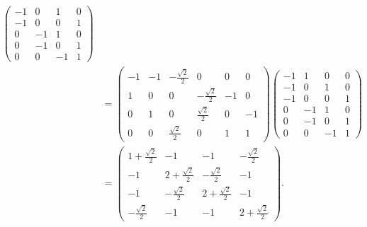 \begin{loesung}
\begin{teilaufgaben}
\begin{align*}
\begin{pmatrix}
  -1&  0&  1&  0\\
  -1&  0&  0&  1\\
   0& -1&  1&  0\\
   0& -1&  0&  1\\
   0&  0& -1&  1
\end{pmatrix}
\\
&=
\begin{pmatrix}
-1&-1&-\frac{\sqrt{2}}2&                0& 0& 0\\
 1& 0&                0&-\frac{\sqrt{2}}2&-1& 0\\
 0& 1&                0& \frac{\sqrt{2}}2& 0&-1\\
 0& 0& \frac{\sqrt{2}}2&                0& 1& 1
\end{pmatrix}
\begin{pmatrix}
  -1&  1&  0&  0\\
  -1&  0&  1&  0\\
  -1&  0&  0&  1\\
   0& -1&  1&  0\\
   0& -1&  0&  1\\
   0&  0& -1&  1
\end{pmatrix}
\\
&=
\begin{pmatrix}
 1+\frac{\sqrt{2}}2&                -1&                -1& -\frac{\sqrt{2}}2\\
-1                 &2+\frac{\sqrt{2}}2& -\frac{\sqrt{2}}2&                -1\\
-1                 & -\frac{\sqrt{2}}2&2+\frac{\sqrt{2}}2&                -1\\
  -\frac{\sqrt{2}}2&                -1&                -1&2+\frac{\sqrt{2}}2
\end{pmatrix}.
\end{align*}
\end{teilaufgaben}
\end{loesung}
